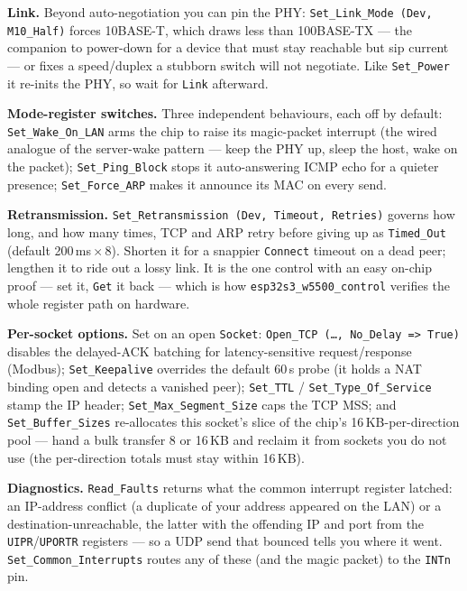\textbf{Link.} Beyond auto-negotiation you can pin the PHY:
\texttt{Set\_Link\_Mode (Dev, M10\_Half)} forces 10BASE-T, which draws less than
100BASE-TX --- the companion to power-down for a device that must stay reachable but
sip current --- or fixes a speed/duplex a stubborn switch will not negotiate. Like
\texttt{Set\_Power} it re-inits the PHY, so wait for \texttt{Link} afterward.

\textbf{Mode-register switches.} Three independent behaviours, each off by default:
\texttt{Set\_Wake\_On\_LAN} arms the chip to raise its magic-packet interrupt (the
wired analogue of the server-wake pattern --- keep the PHY up, sleep the host, wake
on the packet); \texttt{Set\_Ping\_Block} stops it auto-answering ICMP echo for a
quieter presence; \texttt{Set\_Force\_ARP} makes it announce its MAC on every send.

\textbf{Retransmission.} \texttt{Set\_Retransmission (Dev, Timeout, Retries)} governs
how long, and how many times, TCP and ARP retry before giving up as
\texttt{Timed\_Out} (default 200\,ms\,$\times$\,8). Shorten it for a snappier
\texttt{Connect} timeout on a dead peer; lengthen it to ride out a lossy link. It is
the one control with an easy on-chip proof --- set it, \texttt{Get} it back --- which
is how \texttt{esp32s3\_w5500\_control} verifies the whole register path on hardware.

\textbf{Per-socket options.} Set on an open \texttt{Socket}:
\texttt{Open\_TCP (\dots, No\_Delay => True)} disables the delayed-ACK batching for
latency-sensitive request/response (Modbus); \texttt{Set\_Keepalive} overrides the
default 60\,s probe (it holds a NAT binding open and detects a vanished peer);
\texttt{Set\_TTL} / \texttt{Set\_Type\_Of\_Service} stamp the IP header;
\texttt{Set\_Max\_Segment\_Size} caps the TCP MSS; and \texttt{Set\_Buffer\_Sizes}
re-allocates this socket's slice of the chip's 16\,KB-per-direction pool --- hand a
bulk transfer 8 or 16\,KB and reclaim it from sockets you do not use (the
per-direction totals must stay within 16\,KB).

\textbf{Diagnostics.} \texttt{Read\_Faults} returns what the common interrupt
register latched: an IP-address conflict (a duplicate of your address appeared on the
LAN) or a destination-unreachable, the latter with the offending IP and port from the
\texttt{UIPR}/\texttt{UPORTR} registers --- so a UDP send that bounced tells you where
it went. \texttt{Set\_Common\_Interrupts} routes any of these (and the magic packet)
to the \texttt{INTn} pin.

